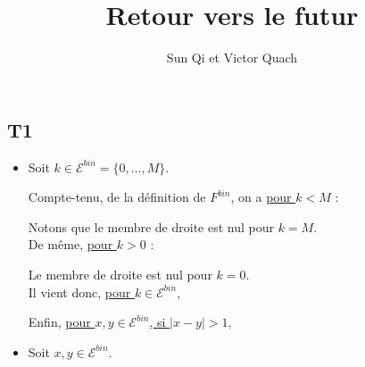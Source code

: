 \documentclass[a4paper,11pt]{article}
\title{Retour vers le futur}
\author{Sun Qi et Victor Quach}
\date{}
\def \E{\mathcal{E}}
\begin{document}
\maketitle

\subsection*{T1}

\begin{itemize}
\item[\textbullet]
Soit $k \in \E^{bin}=\{0, \dots, M\}$. 

Compte-tenu, de la définition de $F^{bin}$, on a \underline{pour $k<M$} :


\begin{center}
\end{center}

Notons que le membre de droite est nul pour $k=M$.\\


De même, \underline{pour $k>0$} : 
\begin{center}
\end{center}
Le membre de droite est nul pour $k=0$.\\


Il vient donc, \underline{pour $k \in \E^{bin}$},
\begin{center}
\end{center}

Enfin, \underline{pour $x,y \in \E^{bin}$, si $|x-y|>1$},
\begin{center}
\end{center}




\item
Soit $x,y \in \E^{bin}$.

\end{itemize}
\end{document}
